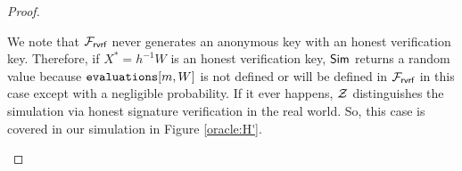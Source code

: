 \begin{proof}
\begin{itemize}
		We note that $ \mathcal{F}_{\textsf{rvrf}} $ never generates an anonymous key with an honest verification key. Therefore, if $ X^* = h^{-1}W $ is an honest verification key, $ \mathsf{Sim} $ returns a random value because  $ \texttt{evaluations}[m,W] $ is not defined or will be defined in $ \mathcal{F}_{\textsf{rvrf}} $ in this case except with a negligible probability. If it ever happens, $ \mathcal{Z} $ distinguishes the simulation via honest signature verification in the real world. So, this case is covered in our simulation in Figure \ref{oracle:H'}.
		
		
		\begin{figure}
			\centering
			
			\noindent{}
\end{figure}
\end{itemize}
\end{proof}
